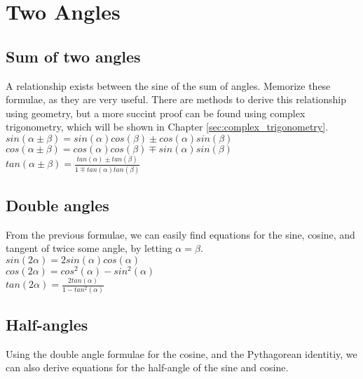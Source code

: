 \section{Two Angles}

\subsection{Sum of two angles}

A relationship exists between the sine of the sum of angles.  Memorize these formulae, as they are very useful.  There are methods to derive this relationship using geometry, but a more succint proof can be found using complex trigonometry, which will be shown in Chapter \ref{sec:complex_trigonometry}.\\

\tab$sin(\alpha \pm \beta) = sin(\alpha)cos(\beta) \pm cos(\alpha)sin(\beta)$\\

\tab$cos(\alpha \pm \beta) = cos(\alpha)cos(\beta) \mp sin(\alpha)sin(\beta)$\\

\tab$tan(\alpha \pm \beta) = \frac{tan(\alpha) \pm tan(\beta)}{1 \mp tan(\alpha)tan(\beta)}$\\

\subsection{Double angles}

From the previous formulae, we can easily find equations for the sine, cosine, and tangent of twice some angle, by letting $\alpha = \beta$.\\

\tab$sin(2\alpha) = 2sin(\alpha)cos(\alpha)$\\

\tab$cos(2\alpha) = cos^2(\alpha) - sin^2(\alpha)$\\

\tab$tan(2\alpha) = \frac{2tan(\alpha)}{1-tan^2(\alpha)}$

\subsection{Half-angles}

Using the double angle formulae for the cosine, and the Pythagorean identitiy, we can also derive equations for the half-angle of the sine and cosine.\\

